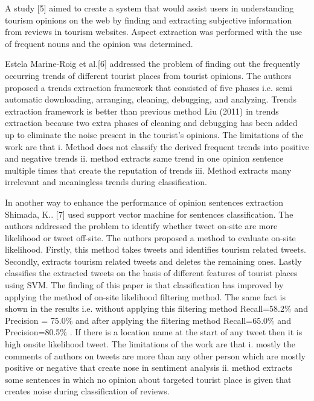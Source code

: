 \documentclass[12pt]{article}
\begin{document}
\vspace{\baselineskip}
\begin{justify}
A study [5] aimed to create a system that would assist users in understanding tourism opinions on the web by finding and extracting subjective information from reviews in tourism websites. Aspect extraction was performed with the use of frequent nouns and the opinion was determined. 
\end{justify}\par


\vspace{\baselineskip}
\begin{justify}
Estela Marine-Roig et al.[6] addressed the problem of finding out the frequently occurring trends of different tourist places from tourist opinions. The authors proposed a trends extraction framework that consisted of five phases i.e. semi automatic downloading, arranging, cleaning, debugging, and analyzing. Trends extraction framework is better than previous method Liu (2011) in trends extraction because two extra phases of cleaning and debugging has been added up to eliminate the noise present in the tourist's opinions. The limitations of the work are that i. Method does not classify the derived frequent trends into positive and negative trends ii. method extracts same trend in one opinion sentence multiple times that create the reputation of trends iii. Method extracts many irrelevant and meaningless trends during classification. 
\end{justify}\par


\vspace{\baselineskip}
\begin{justify}
In another way to enhance the performance of opinion sentences extraction Shimada, K.. [7] used support vector machine for sentences classification. The authors addressed the problem to identify whether tweet on-site are more likelihood or tweet off-site. The authors proposed a method to evaluate on-site likelihood. Firstly, this method takes tweets and identifies tourism related tweets. Secondly, extracts tourism related tweets and deletes the remaining ones. Lastly classifies the extracted tweets on the basis of different features of tourist places using SVM. The finding of this paper is that classification has improved by applying the method of on-site likelihood filtering method. The same fact is shown in the results i.e. without applying this filtering method Recall=58.2$\%$  and Precision = 75.0$\%$  and after applying the filtering method Recall=65.0$\%$  and Precision=80.5$\%$ . If there is a location name at the start of any tweet then it is high onsite likelihood tweet. The limitations of the work are that i. mostly the comments of authors on tweets are more than any other person which are mostly positive or negative that create nose in sentiment analysis ii. method extracts some sentences in which no opinion about targeted tourist place is given that creates noise during classification of reviews.  
\end{justify}\par
\end{document}
